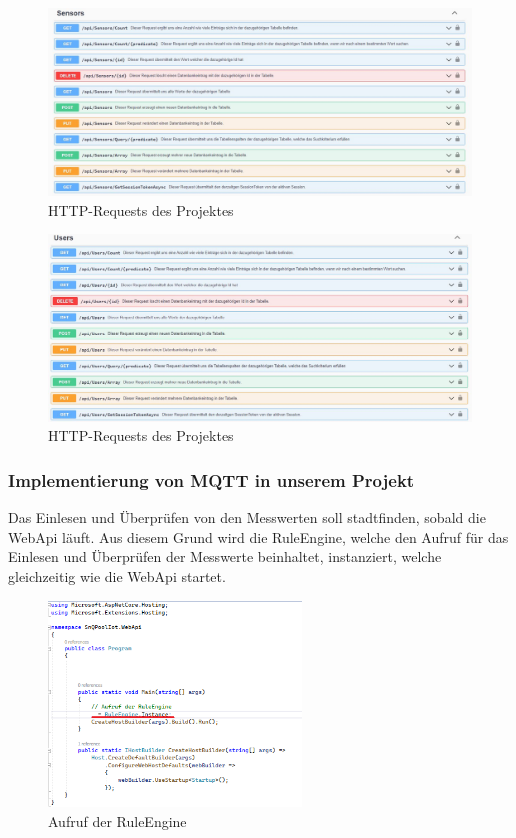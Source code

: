 \begin{figure}[H]
    \centering
    \includegraphics[width=1.6\textwidth]{pics/WebApiRequests8.JPG}
    \caption{HTTP-Requests des Projektes}
\end{figure}

\begin{figure}[H]
    \centering
    \includegraphics[width=1.6\textwidth]{pics/WebApiRequests9.JPG}
    \caption{HTTP-Requests des Projektes}
\end{figure}

\subsubsection{Implementierung von MQTT in unserem Projekt}
Das Einlesen und Überprüfen von den Messwerten soll stadtfinden, sobald die WebApi läuft.
Aus diesem Grund wird die RuleEngine, 
welche den Aufruf für das Einlesen und Überprüfen der Messwerte beinhaltet, instanziert, welche gleichzeitig wie die WebApi startet.

\begin{figure}[H]
    \centering
    \includegraphics[width=0.6\textwidth]{pics/RuleEngineCall.png}
    \caption{Aufruf der RuleEngine}
\end{figure}

